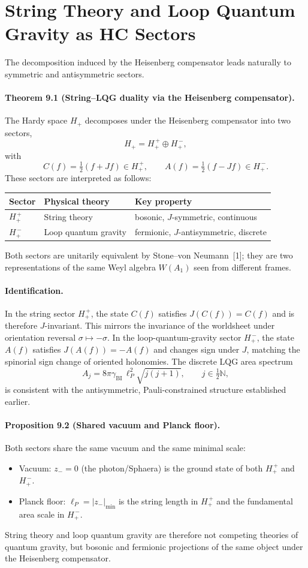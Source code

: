 \section{String Theory and Loop Quantum Gravity as HC Sectors}
The decomposition induced by the Heisenberg compensator leads naturally to symmetric and antisymmetric sectors.

\paragraph*{Theorem 9.1 (String--LQG duality via the Heisenberg compensator).}
The Hardy space $H_+$ decomposes under the Heisenberg compensator into two sectors,
\[
H_+ = H_+^{\,+} \oplus H_+^{\,-},
\]
with
\[
C(f)=\tfrac12(f+Jf) \in H_+^{\,+}, \qquad A(f)=\tfrac12(f-Jf) \in H_+^{\,-}.
\]
These sectors are interpreted as follows:
\begin{center}
\begin{tabular}{lll}
\toprule
Sector & Physical theory & Key property \\
\midrule
$H_+^{\,+}$ & String theory & bosonic, $J$-symmetric, continuous \\
$H_+^{\,-}$ & Loop quantum gravity & fermionic, $J$-antisymmetric, discrete \\
\bottomrule
\end{tabular}
\end{center}
Both sectors are unitarily equivalent by Stone--von Neumann~[1]; they are two representations of the same Weyl algebra $W(A_1)$ seen from different frames.

\paragraph*{Identification.}
In the string sector $H_+^{\,+}$, the state $C(f)$ satisfies $J(C(f))=C(f)$ and is therefore $J$-invariant. This mirrors the invariance of the worldsheet under orientation reversal $\sigma \mapsto -\sigma$. In the loop-quantum-gravity sector $H_+^{\,-}$, the state $A(f)$ satisfies $J(A(f))=-A(f)$ and changes sign under $J$, matching the spinorial sign change of oriented holonomies. The discrete LQG area spectrum
\[
A_j = 8\pi \gamma_{\mathrm{BI}} \, \ell_P^2 \sqrt{j(j+1)}, \qquad j \in \tfrac12\mathbb{N},
\]
is consistent with the antisymmetric, Pauli-constrained structure established earlier.

\paragraph*{Proposition 9.2 (Shared vacuum and Planck floor).}
Both sectors share the same vacuum and the same minimal scale:
\begin{itemize}
  \item Vacuum: $z_-=0$ (the photon/Sphaera) is the ground state of both $H_+^{\,+}$ and $H_+^{\,-}$.
  \item Planck floor: $\ell_P = |z_-|_{\min}$ is the string length in $H_+^{\,+}$ and the fundamental area scale in $H_+^{\,-}$.
\end{itemize}
String theory and loop quantum gravity are therefore not competing theories of quantum gravity, but bosonic and fermionic projections of the same object under the Heisenberg compensator.

